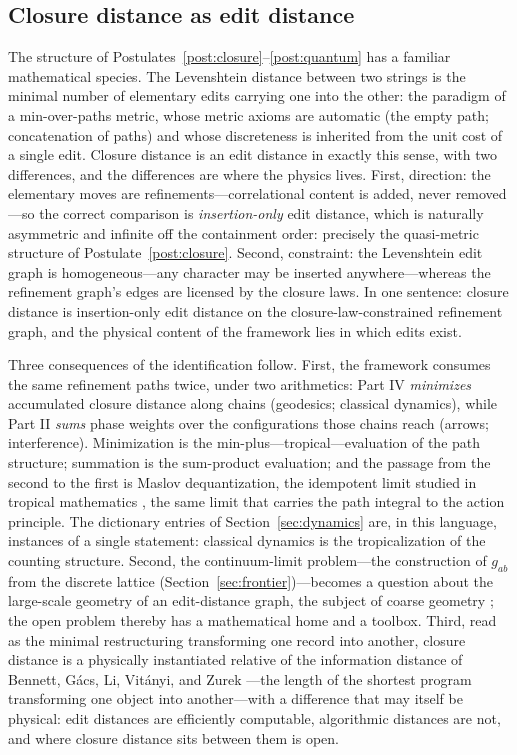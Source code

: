 \documentclass[11pt]{article}
\theoremstyle{definition}
\theoremstyle{remark}
\begin{document}
\subsection{Closure distance as edit distance}\label{sec:editdistance}
The structure of Postulates~\ref{post:closure}--\ref{post:quantum} has a familiar mathematical species. The Levenshtein distance between two strings \cite{Levenshtein1966} is the minimal number of elementary edits carrying one into the other: the paradigm of a min-over-paths metric, whose metric axioms are automatic (the empty path; concatenation of paths) and whose discreteness is inherited from the unit cost of a single edit. Closure distance is an edit distance in exactly this sense, with two differences, and the differences are where the physics lives. First, direction: the elementary moves are refinements---correlational content is added, never removed---so the correct comparison is \emph{insertion-only} edit distance, which is naturally asymmetric and infinite off the containment order: precisely the quasi-metric structure of Postulate~\ref{post:closure}. Second, constraint: the Levenshtein edit graph is homogeneous---any character may be inserted anywhere---whereas the refinement graph's edges are licensed by the closure laws. In one sentence: closure distance is insertion-only edit distance on the closure-law-constrained refinement graph, and the physical content of the framework lies in which edits exist.

Three consequences of the identification follow. First, the framework consumes the same refinement paths twice, under two arithmetics: Part IV \emph{minimizes} accumulated closure distance along chains (geodesics; classical dynamics), while Part II \emph{sums} phase weights over the configurations those chains reach (arrows; interference). Minimization is the min-plus---tropical---evaluation of the path structure; summation is the sum-product evaluation; and the passage from the second to the first is Maslov dequantization, the idempotent limit studied in tropical mathematics \cite{Litvinov2007}, the same limit that carries the path integral to the action principle. The dictionary entries of Section~\ref{sec:dynamics} are, in this language, instances of a single statement: classical dynamics is the tropicalization of the counting structure. Second, the continuum-limit problem---the construction of $g_{ab}$ from the discrete lattice (Section~\ref{sec:frontier})---becomes a question about the large-scale geometry of an edit-distance graph, the subject of coarse geometry \cite{Gromov1993}; the open problem thereby has a mathematical home and a toolbox. Third, read as the minimal restructuring transforming one record into another, closure distance is a physically instantiated relative of the information distance of Bennett, G\'acs, Li, Vit\'anyi, and Zurek \cite{BGLVZ1998}---the length of the shortest program transforming one object into another---with a difference that may itself be physical: edit distances are efficiently computable, algorithmic distances are not, and where closure distance sits between them is open.
\end{document}
